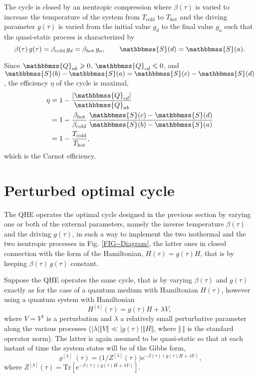 \documentclass[aps,pra,floatfix,twocolumn,groupedaddress,superscriptaddress,nofootinbib,notitlepage,amsmath,amssymb,]{revtex4-1}
\begin{document}
The cycle is closed by an isentropic compression where $\beta(\tau)$ is varied to increase the temperature of the system from $T_{\mathrm{cold}}$ to $T_{\mathrm{hot}}$ and the driving parameter $g(\tau)$ is varied from the initial value $g_d$ to the final value $g_a$ such that the quasi-static process is characterized by
\begin{equation}
\label{adiab2}
\beta(\tau)\,g(\tau)=\beta_{\mathrm{cold}}\,g_d=\beta_{\mathrm{hot}}\,g_a,\qquad \mathbbmss{S}(d)=\mathbbmss{S}(a).
\end{equation}

Since $\mathbbmss{Q}_{ab}\geqslant 0$, $\mathbbmss{Q}_{cd}\leqslant 0$, and $\mathbbmss{S}(b)-\mathbbmss{S}(a)=\mathbbmss{S}(c)-\mathbbmss{S}(d)$, the efficiency $\eta$ of the cycle is maximal,
\begin{align}
\eta &=1-\frac{\left|\mathbbmss{Q}_{cd}\right|}{\mathbbmss{Q}_{ab}}\nonumber\\
 & =1-\frac{\beta_{\mathrm{hot}}}{\beta_{\mathrm{cold}}}\,\frac{\mathbbmss{S}(c)-\mathbbmss{S}(d)}{\mathbbmss{S}(b)-\mathbbmss{S}(a)}\nonumber\\
& =1-\frac{T_{\mathrm{cold}}}{T_{\mathrm{hot}}}, \label{Carnoteff}	
\end{align}
which is the Carnot efficiency.

\section{Perturbed optimal cycle}
\label{sec:generic}

The QHE operates the optimal cycle designed in the previous section by varying one or both of the external parameters, namely the inverse temperature $\beta(\tau)$ and the driving $g(\tau)$, in such a way to implement the two isothermal and the two isentropic processes in Fig. \ref{FIG--Diagram}, the latter ones in closed connection with the form of the Hamiltonian, $H(\tau)=g(\tau)H$, that is by keeping $\beta(\tau)\,g(\tau)$ constant.

Suppose the QHE operates the same cycle, that is by varying $\beta(\tau)$ and $g(\tau)$ exactly as for the case of a quantum medium with Hamiltonian $H(\tau)$, however using a quantum system with Hamiltonian 
\begin{equation}
\label{perturb0}
H^{[\lambda]}(\tau)=g(\tau) H+\lambda V,
\end{equation}
where $V=V^\dag$ is a perturbation and $\lambda$ a relatively small perturbative parameter along the various processes ($|\lambda| \Vert V\Vert\ll |g(\tau)|\Vert H\Vert$, where $\Vert\,\Vert$ is the standard operator norm). The latter is again assumed to be quasi-static so that at each instant of time the system states will be of the Gibbs form,
\begin{equation}
\label{pertGibbs1}
\varrho^{[\lambda]}(\tau)=\big(1/Z^{[\lambda]}(\tau)\big)\mathrm{e}^{-\beta(\tau)(g(\tau) H+\lambda V)},
\end{equation}
where $Z^{[\lambda]}(\tau)=\mathrm{Tr}[\mathrm{e}^{-\beta(\tau)(g(\tau)H+\lambda V)}]$.
\end{document}
